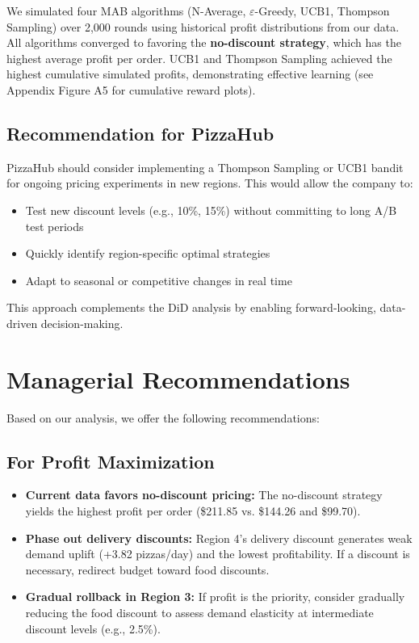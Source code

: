 \documentclass[12pt]{article}
\begin{document}
We simulated four MAB algorithms (N-Average, $\varepsilon$-Greedy, UCB1, Thompson Sampling) over 2,000 rounds using historical profit distributions from our data. All algorithms converged to favoring the \textbf{no-discount strategy}, which has the highest average profit per order. UCB1 and Thompson Sampling achieved the highest cumulative simulated profits, demonstrating effective learning (see Appendix Figure A5 for cumulative reward plots).

\subsection{Recommendation for PizzaHub}

PizzaHub should consider implementing a Thompson Sampling or UCB1 bandit for ongoing pricing experiments in new regions. This would allow the company to:
\begin{itemize}[nosep]
    \item Test new discount levels (e.g., 10\%, 15\%) without committing to long A/B test periods
    \item Quickly identify region-specific optimal strategies
    \item Adapt to seasonal or competitive changes in real time
\end{itemize}

This approach complements the DiD analysis by enabling forward-looking, data-driven decision-making.

\section{Managerial Recommendations}

Based on our analysis, we offer the following recommendations:

\subsection{For Profit Maximization}
\begin{itemize}[nosep]
    \item \textbf{Current data favors no-discount pricing:} The no-discount strategy yields the highest profit per order (\$211.85 vs. \$144.26 and \$99.70).
    \item \textbf{Phase out delivery discounts:} Region 4's delivery discount generates weak demand uplift (+3.82 pizzas/day) and the lowest profitability. If a discount is necessary, redirect budget toward food discounts.
    \item \textbf{Gradual rollback in Region 3:} If profit is the priority, consider gradually reducing the food discount to assess demand elasticity at intermediate discount levels (e.g., 2.5\%).
\end{itemize}
\end{document}
